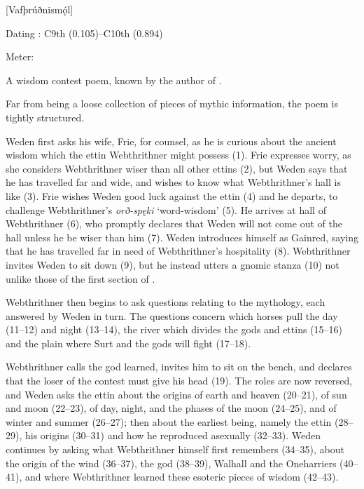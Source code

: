 [Vafþrúðnismǫ́l]

\begin{flushright}%
Dating \parencite{Sapp2022}: C9th (0.105)–C10th (0.894)

Meter: \Ljodahattr%
\end{flushright}%

A wisdom contest poem, known by the author of \Gylfaginning.

Far from being a loose collection of pieces of mythic information, the poem is tightly structured.

Weden first asks his wife, Frie, for counsel, as he is curious about the ancient wisdom which the ettin Webthrithner might possess (1). Frie expresses worry, as she considers Webthrithner wiser than all other ettins (2), but Weden says that he has travelled far and wide, and wishes to know what Webthrithner’s hall is like (3). Frie wishes Weden good luck against the ettin (4) and he departs, to challenge Webthrithner’s \emph{orð-spęki} ‘word-wisdom’ (5). He arrives at hall of Webthrithner (6), who promptly declares that Weden will not come out of the hall unless he be wiser than him (7). Weden introduces himself as Gainred, saying that he has travelled far in need of Webthrithner’s hospitality (8). Webthrithner invites Weden to sit down (9), but he instead utters a gnomic stanza (10) not unlike those of the first section of \Havamal.

Webthrithner then begins to ask questions relating to the mythology, each answered by Weden in turn. The questions concern which horses pull the day (11–12) and night (13–14), the river which divides the gods and ettins (15–16) and the plain where Surt and the gods will fight (17–18).

Webthrithner calls the god learned, invites him to sit on the bench, and declares that the loser of the contest must give his head (19). The roles are now reversed, and Weden asks the ettin about the origins of earth and heaven (20–21), of sun and moon (22–23), of day, night, and the phases of the moon (24–25), and of winter and summer (26–27); then about the earliest being, namely the ettin  (28–29), his origins (30–31) and how he reproduced asexually (32–33). Weden continues by asking what Webthrithner himself first remembers (34–35), about the origin of the wind (36–37), the god  (38–39), Walhall and the Oneharriers (40–41), and where Webthrithner learned these esoteric pieces of wisdom (42–43).

